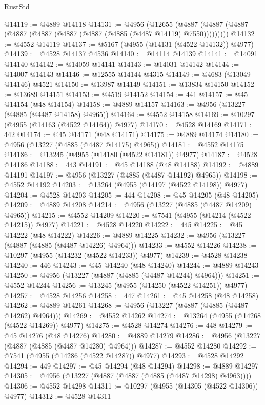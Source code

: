 \begin{lexlean}{RustStd}
\begin{coremodule}
@14119 := @4889 @14118
@14131 := @4956
    (@12655 (@4887 (@4887 (@4887 (@4887 (@4887 (@4887 (@4887 (@4885 (@4487 @14119) @7550)))))))))
@14132 := @4552 @14119
@14137 := @5167 (@4955 (@14131 (@4522 @14132)) @4977)
@14139 := @4528 @14137 @4536
@14140 := @14114 @14139
@14141 := @14091 @14140
@14142 := @14059 @14141
@14143 := @14031 @14142
@14144 := @14007 @14143
@14146 := @12555 @14144 @4315
@14149 := @4683 (@13049 @14146) @4521
@14150 := @13987 @14149
@14151 := @13834 @14150
@14152 := @13689 @14151
@14153 := @4519 @14152
@14154 := 441
@14157 := @45 @14154 (@48 @14154)
@14158 := @4889 @14157
@14163 := @4956 (@13227 (@4885 (@4487 @14158) @4965))
@14164 := @4552 @14158
@14169 := @10297 (@4955 (@14163 (@4522 @14164)) @4977)
@14170 := @4528 @14169
@14171 := 442
@14174 := @45 @14171 (@48 @14171)
@14175 := @4889 @14174
@14180 := @4956 (@13227 (@4885 (@4487 @14175) @4965))
@14181 := @4552 @14175
@14186 := @13245 (@4955 (@14180 (@4522 @14181)) @4977)
@14187 := @4528 @14186
@14188 := 443
@14191 := @45 @14188 (@48 @14188)
@14192 := @4889 @14191
@14197 := @4956 (@13227 (@4885 (@4487 @14192) @4965))
@14198 := @4552 @14192
@14203 := @13264 (@4955 (@14197 (@4522 @14198)) @4977)
@14204 := @4528 @14203
@14205 := 444
@14208 := @45 @14205 (@48 @14205)
@14209 := @4889 @14208
@14214 := @4956 (@13227 (@4885 (@4487 @14209) @4965))
@14215 := @4552 @14209
@14220 := @7541 (@4955 (@14214 (@4522 @14215)) @4977)
@14221 := @4528 @14220
@14222 := 445
@14225 := @45 @14222 (@48 @14222)
@14226 := @4889 @14225
@14232 := @4956 (@13227 (@4887 (@4885 (@4487 @14226) @4964)))
@14233 := @4552 @14226
@14238 := @10297 (@4955 (@14232 (@4522 @14233)) @4977)
@14239 := @4528 @14238
@14240 := 446
@14243 := @45 @14240 (@48 @14240)
@14244 := @4889 @14243
@14250 := @4956 (@13227 (@4887 (@4885 (@4487 @14244) @4964)))
@14251 := @4552 @14244
@14256 := @13245 (@4955 (@14250 (@4522 @14251)) @4977)
@14257 := @4528 @14256
@14258 := 447
@14261 := @45 @14258 (@48 @14258)
@14262 := @4889 @14261
@14268 := @4956 (@13227 (@4887 (@4885 (@4487 @14262) @4964)))
@14269 := @4552 @14262
@14274 := @13264 (@4955 (@14268 (@4522 @14269)) @4977)
@14275 := @4528 @14274
@14276 := 448
@14279 := @45 @14276 (@48 @14276)
@14280 := @4889 @14279
@14286 := @4956 (@13227 (@4887 (@4885 (@4487 @14280) @4964)))
@14287 := @4552 @14280
@14292 := @7541 (@4955 (@14286 (@4522 @14287)) @4977)
@14293 := @4528 @14292
@14294 := 449
@14297 := @45 @14294 (@48 @14294)
@14298 := @4889 @14297
@14305 := @4956 (@13227 (@4887 (@4887 (@4885 (@4487 @14298) @4963))))
@14306 := @4552 @14298
@14311 := @10297 (@4955 (@14305 (@4522 @14306)) @4977)
@14312 := @4528 @14311

\end{coremodule}
\end{lexlean}
